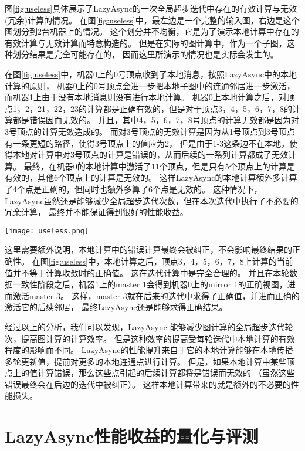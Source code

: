 图\ref{fig:useless}具体展示了LazyAsync的一次全局超步迭代中存在的有效计算与无效(冗余)计算的情况。
在图\ref{fig:useless}中，最左边是一个完整的输入图，右边是这个图划分到2台机器上的情况。
这个划分并不均衡，它是为了演示本地计算中存在的有效计算与无效计算而特意构造的。
但是在实际的图计算中，作为一个子图，这种划分结果是完全可能存在的，
因而这里所演示的情况也是实际会发生的。

在图\ref{fig:useless}中，机器0上的0号顶点收到了本地消息，按照LazyAsync中的本地计算的原则，
机器0上的0号顶点会进一步把本地子图中的连通邻居进一步激活，而机器1上由于没有本地消息则没有进行本地计算。
机器0上本地计算之后，对顶点1，2，21，22，23的计算都是正确有效的，但是对于顶点3，4，5，6，7，8的计算都是错误因而无效的。
并且，其中4，5，6，7，8号顶点的计算无效都是因为对3号顶点的计算无效造成的。
而对3号顶点的无效计算是因为从1号顶点到3号顶点有一条更短的路径，使得3号顶点上的值应为2，
但是由于1-3这条边不在本地，使得本地对计算中对3号顶点的计算是错误的，从而后续的一系列计算都成了无效计算。
最终，在机器0的本地计算中激活了11个顶点，但是只有5个顶点上的计算是有效的，其他6个顶点上的计算是无效的。
这样LazyAsync的本地计算额外多计算了4个点是正确的，但同时也额外多算了6个点是无效的。
这种情况下，LazyAsync虽然还是能够减少全局超步迭代次数，但在本次迭代中执行了不必要的冗余计算，
最终并不能保证得到很好的性能收益。

\begin{center}
  \texttt{[image: useless.png]}
  \label{fig:useless}
\end{center}  

这里需要额外说明，本地计算中的错误计算最终会被纠正，不会影响最终结果的正确性。
在图\ref{fig:useless}中，本地计算之后，顶点3，4，5，6，7，8上计算的当前值并不等于计算收敛时的正确值。
这在迭代计算中是完全合理的。
并且在本轮数据一致性阶段之后，机器1上的master 1会得到机器0上的mirror 1的正确视图，进而激活master 3。
这样，master 3就在后来的迭代中求得了正确值，并进而正确的激活它的后续邻居，
最终LazyAsync还是能够求得正确结果。

经过以上的分析，我们可以发现，LazyAsync 能够减少图计算的全局超步迭代轮次，提高图计算的计算效率。
但是这种效率的提高受每轮迭代中本地计算的有效程度的影响而不同。
LazyAsync的性能提升来自于它的本地计算能够在本地传播多轮更新值，提前对更多的本地连通点进行计算。
但是，如果本地计算中某些顶点上的值计算错误，那么这些点引起的后续计算都将是错误而无效的
（虽然这些错误最终会在后边的迭代中被纠正）。
这样本地计算带来的就是额外的不必要的性能损失。


\section{LazyAsync性能收益的量化与评测}  

